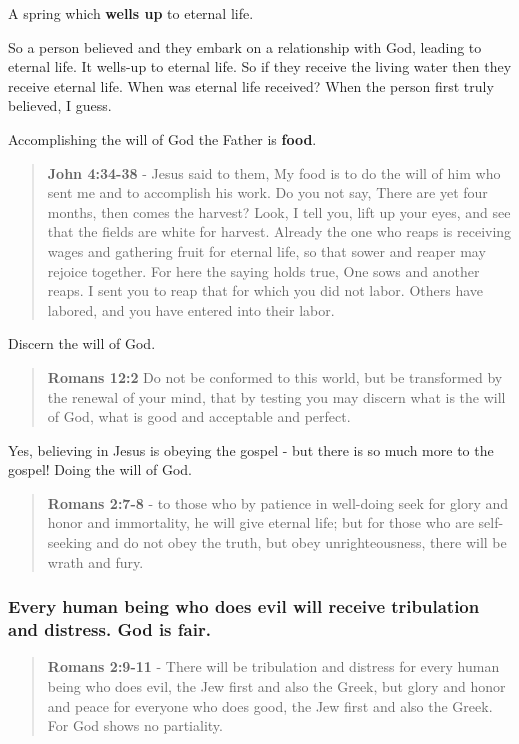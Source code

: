 \documentclass[11pt]{article}
\begin{document}
A spring which \textbf{wells up} to eternal life.

So a person believed and they embark on a relationship with God, leading to eternal life.
It wells-up to eternal life. So if they receive the living water then they receive eternal life.
When was eternal life received? When the person first truly believed, I guess.

Accomplishing the will of God the Father is \textbf{food}.

\begin{quote}
\textbf{John 4:34-38} - Jesus said to them, My food is to do the will of him who sent me and to accomplish his work. Do you not say, There are yet four months, then comes the harvest? Look, I tell you, lift up your eyes, and see that the fields are white for harvest. Already the one who reaps is receiving wages and gathering fruit for eternal life, so that sower and reaper may rejoice together. For here the saying holds true, One sows and another reaps. I sent you to reap that for which you did not labor. Others have labored, and you have entered into their labor.
\end{quote}

Discern the will of God.

\begin{quote}
\textbf{Romans 12:2} Do not be conformed to this world, but be transformed by the renewal of your mind, that by testing you may discern what is the will of God, what is good and acceptable and perfect.
\end{quote}

Yes, believing in Jesus is obeying the gospel - but there is so much more to the gospel! Doing the will of God.

\begin{quote}
\textbf{Romans 2:7-8} - to those who by patience in well-doing seek for glory and honor and immortality, he will give eternal life; but for those who are self-seeking and do not obey the truth, but obey unrighteousness, there will be wrath and fury.
\end{quote}

\subsubsection{Every human being who does evil will receive tribulation and distress. God is fair.}
\label{sec:orgbd5ace8}
\begin{quote}
\textbf{Romans 2:9-11} - There will be tribulation and distress for every human being who does evil, the Jew first and also the Greek, but glory and honor and peace for everyone who does good, the Jew first and also the Greek. For God shows no partiality.
\end{quote}
\end{document}
